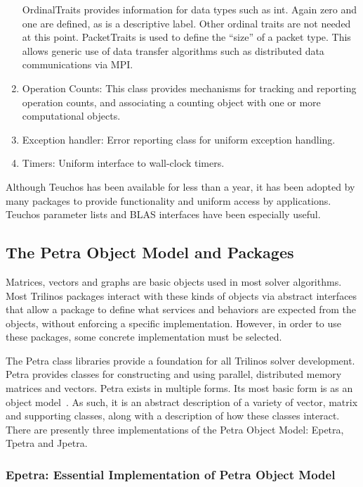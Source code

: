 \documentclass[12pt,relax]{TPA}
\begin{document}
\begin{enumerate}
OrdinalTraits provides information for data types such as int.  Again
zero and one are defined, as is a descriptive label.  Other ordinal traits are
not needed at this point.  PacketTraits is used to define the ``size''
of a packet type.  This
allows generic use of data transfer algorithms such as
distributed data communications via MPI.

\item Operation Counts: This class provides mechanisms for tracking
and reporting operation counts, and associating a counting object with
one or more computational objects.

\item Exception handler:  Error reporting class for uniform exception
handling.

\item Timers:  Uniform interface to wall-clock timers.

\end{enumerate}

Although Teuchos has been available for less than a year, it has been
adopted by many packages to provide functionality and uniform access
by applications.  Teuchos parameter lists and BLAS interfaces have
been especially useful.


\subsection{The Petra Object Model and Packages}
\label{subsect:PetraObjectModel}

Matrices, vectors and graphs are basic objects used in most solver
algorithms. Most Trilinos
packages interact with these kinds of objects via abstract interfaces that
allow a package to define what services and behaviors are expected from 
the objects,
without enforcing a specific implementation.  However, in order to use
these packages, some concrete
implementation must be selected.  

The Petra class libraries provide a
foundation for all Trilinos solver development.  Petra provides classes for
constructing and using parallel, distributed memory matrices and vectors.  
Petra exists in
multiple forms.  Its most basic form is as an object 
model~\cite{HeroHoekWill2002}.
As such, it is an abstract 
description of a variety of vector, matrix and supporting classes, along with a 
description of
how these classes interact.  There are presently three implementations
of the Petra Object Model: Epetra, Tpetra and Jpetra.

\subsubsection{Epetra: Essential Implementation of Petra Object Model}
\end{document}
